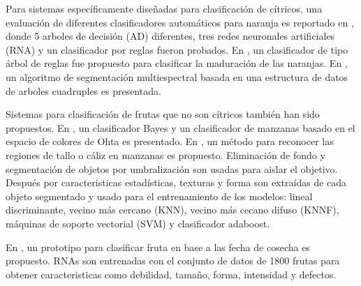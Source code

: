 \documentclass[twoside,spanish,ESP,MSc]{plantillaLabUPV}
\theoremstyle{definition}
\begin{document}
Para sistemas específicamente diseñadas para clasificación de cítricos, una evaluación de diferentes clasificadores automáticos para naranja es reportado en \cite{analis}, donde 5 arboles de decisión (AD) diferentes, tres redes neuronales artificiales (RNA) y un clasificador por reglas fueron probados. En \cite{chokun}, un clasificador de tipo árbol de reglas fue propuesto para clasificar la maduración de las naranjas. En \cite{Martinez-Uso:2005:MIS:1565835.1565847}, un algoritmo de segmentación multiespectral basada en una estructura de datos de arboles cuadruples es presentada. 

Sistemas para clasificación de frutas que no son cítricos también han sido propuestos. En \cite{rgbhisto}, un clasificador Bayes y un clasificador de manzanas basado en el espacio de colores de Ohta es presentado. En \cite{UNAY2007597}, un método para reconocer las regiones de tallo o cáliz en manzanas es propuesto. Eliminación de fondo y segmentación de objetos por umbralización son usadas para aislar el objetivo. Después por caracteristicas estadísticas, texturas y forma son extraídas de cada objeto segmentado y usado para el entrenamiento de los modelos: lineal discriminante, vecino más cercano (KNN), vecino más cecano difuso (KNNF), máquinas de soporte vectorial (SVM) y clasificador adaboost.

En \cite{ALOHALI201129}, un prototipo para clasificar fruta en base a las fecha de cosecha es propuesto. RNAs son entrenadas con el conjunto de datos de 1800 frutas para obtener caracteristicas como debilidad, tamaño, forma, intensidad y defectos.
\end{document}
